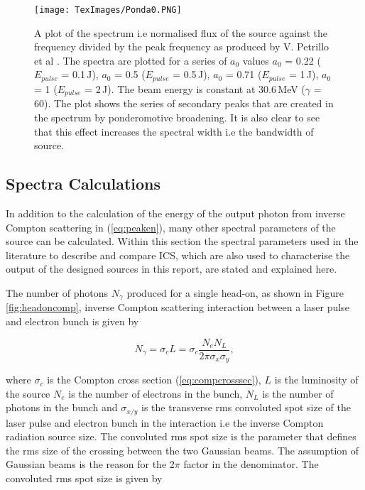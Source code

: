 \documentclass[11pt]{article}
\begin{document}
\begin{figure}[H]
\centering
\texttt{[image: TexImages/Ponda0.PNG]}
\caption{\label{fig:PondSec} A plot of the spectrum i.e normalised flux of the source against the frequency divided by the peak frequency  as produced by V. Petrillo et al \cite{PetrilloPond}. The spectra are plotted for a series of $a_{0}$ values $a_{0}$ = 0.22 ($E_{pulse}$ = 0.1\,J), $a_{0}$ = 0.5 ($E_{pulse}$ = 0.5\,J), $a_{0}$ = 0.71 ($E_{pulse}$ = 1\,J), $a_{0}$ = 1 ($E_{pulse}$ = 2\,J). The beam energy is constant at 30.6\,MeV ($\gamma$ = 60). The plot shows the series of secondary peaks that are created in the spectrum by ponderomotive broadening. It is also clear to see that this effect increases the spectral width i.e the bandwidth of source.}
\end{figure}


\subsection{Spectra Calculations}
\label{sec:SpecCalc}

In addition to the calculation of the energy of the output photon from inverse Compton scattering in (\ref{eq:peaken}), many other spectral parameters of the source can be calculated. Within this section the spectral parameters used in the literature to describe and compare ICS, which are also used to characterise the output of the designed sources in this report, are stated and explained here.

The number of photons $N_{\gamma}$ produced for a single head-on, as shown in Figure \ref{fig:headoncomp}, inverse Compton scattering interaction between a laser pulse and electron bunch is given by

\begin{equation}
N_{\gamma} = \sigma_{c} L = \sigma_{c}\frac{N_{e}N_{L}}{2\pi\sigma_{x}\sigma_{y}},
\label{eq:Fshot}
\end{equation}

\noindent where $\sigma_{c}$ is the Compton cross section (\ref{eq:compcrosssec}), $L$ is the luminosity of the source $N_{e}$ is the number of electrons in the bunch, $N_{L}$ is the number of photons in the bunch and $\sigma_{x/y}$ is the transverse rms convoluted spot size of the laser pulse and electron bunch in the interaction i.e the inverse Compton radiation source size. The convoluted rms spot size is the parameter that defines the rms size of the crossing between the two Gaussian beams. The assumption of Gaussian beams is the reason for the 2$\pi$ factor in the denominator. The convoluted rms spot size is given by
\end{document}
